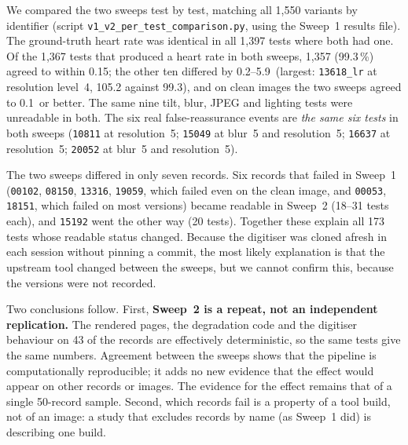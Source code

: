 We compared the two sweeps test by test, matching all 1{,}550 variants by identifier (script \texttt{v1\_v2\_per\_test\_comparison.py}, using the Sweep~1 results file). The ground-truth heart rate was identical in all 1{,}397 tests where both had one. Of the 1{,}367 tests that produced a heart rate in both sweeps, 1{,}357 (99.3\,\%) agreed to within 0.15\bpm; the other ten differed by 0.2--5.9\bpm\ (largest: \texttt{13618\_lr} at resolution level~4, 105.2 against 99.3\bpm), and on clean images the two sweeps agreed to 0.1\bpm\ or better. The same nine tilt, blur, JPEG and lighting tests were unreadable in both. The six real false-reassurance events are \emph{the same six tests} in both sweeps (\texttt{10811} at resolution~5; \texttt{15049} at blur~5 and resolution~5; \texttt{16637} at resolution~5; \texttt{20052} at blur~5 and resolution~5).

The two sweeps differed in only seven records. Six records that failed in Sweep~1 (\texttt{00102}, \texttt{08150}, \texttt{13316}, \texttt{19059}, which failed even on the clean image, and \texttt{00053}, \texttt{18151}, which failed on most versions) became readable in Sweep~2 (18--31 tests each), and \texttt{15192} went the other way (20 tests). Together these explain all 173 tests whose readable status changed. Because the digitiser was cloned afresh in each session without pinning a commit, the most likely explanation is that the upstream tool changed between the sweeps, but we cannot confirm this, because the versions were not recorded.

Two conclusions follow. First, \textbf{Sweep~2 is a repeat, not an independent replication.} The rendered pages, the degradation code and the digitiser behaviour on 43 of the records are effectively deterministic, so the same tests give the same numbers. Agreement between the sweeps shows that the pipeline is computationally reproducible; it adds no new evidence that the effect would appear on other records or images. The evidence for the effect remains that of a single 50-record sample. Second, which records fail is a property of a tool build, not of an image: a study that excludes records by name (as Sweep~1 did) is describing one build.
